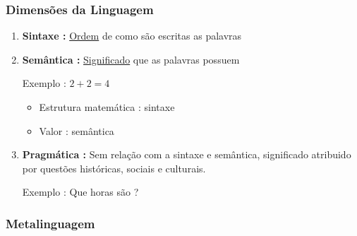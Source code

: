         \subsubsection*{Dimensões da Linguagem}
           
            \begin{enumerate}[left=0.5cm, align=left, nosep]
                \item \textbf{Sintaxe :} \underline{Ordem} de como são escritas as palavras
                \item \textbf{Semântica :} \underline{Significado} que as palavras possuem
                
                Exemplo : $2 + 2 = 4$
                \begin{itemize}[left=0.5cm, nosep, label=$\hookrightarrow$]
                    \item Estrutura matemática : sintaxe 
                    \item Valor : semântica
                \end{itemize}

                \item \textbf{Pragmática :} Sem relação com a sintaxe e semântica, significado atribuido por 
                questões históricas, sociais e culturais.
                
                Exemplo : Que horas são ?
            
            \end{enumerate}

        \subsubsection*{Metalinguagem}
            
